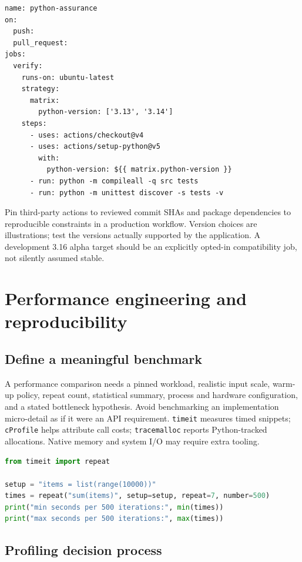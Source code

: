 \documentclass[
  11pt,
]{report}
\newcommand{\passthrough}[1]{#1}
\begin{document}
\begin{lstlisting}
name: python-assurance
on:
  push:
  pull_request:
jobs:
  verify:
    runs-on: ubuntu-latest
    strategy:
      matrix:
        python-version: ['3.13', '3.14']
    steps:
      - uses: actions/checkout@v4
      - uses: actions/setup-python@v5
        with:
          python-version: ${{ matrix.python-version }}
      - run: python -m compileall -q src tests
      - run: python -m unittest discover -s tests -v
\end{lstlisting}

Pin third-party actions to reviewed commit SHAs and package dependencies
to reproducible constraints in a production workflow. Version choices
are illustrations; test the versions actually supported by the
application. A development 3.16 alpha target should be an explicitly
opted-in compatibility job, not silently assumed stable.

\chapter{Performance engineering and
reproducibility}\label{performance-engineering-and-reproducibility}

\section{Define a meaningful
benchmark}\label{define-a-meaningful-benchmark}

A performance comparison needs a pinned workload, realistic input scale,
warm-up policy, repeat count, statistical summary, process and hardware
configuration, and a stated bottleneck hypothesis. Avoid benchmarking an
implementation micro-detail as if it were an API requirement.
\passthrough{\lstinline!timeit!} measures timed snippets;
\passthrough{\lstinline!cProfile!} helps attribute call costs;
\passthrough{\lstinline!tracemalloc!} reports Python-tracked
allocations. Native memory and system I/O may require extra tooling.

\begin{lstlisting}[language=Python]
from timeit import repeat

setup = "items = list(range(10000))"
times = repeat("sum(items)", setup=setup, repeat=7, number=500)
print("min seconds per 500 iterations:", min(times))
print("max seconds per 500 iterations:", max(times))
\end{lstlisting}

\section{Profiling decision process}\label{profiling-decision-process}
\end{document}
